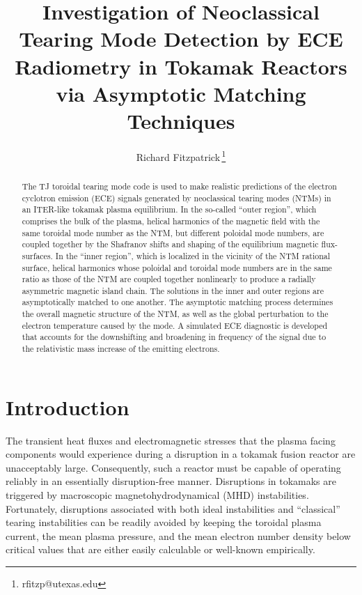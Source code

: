 \documentclass[12pt,prb,aps]{revtex4-1}
\begin{document}
\title{Investigation of Neoclassical Tearing Mode Detection by ECE Radiometry in  Tokamak Reactors via Asymptotic Matching Techniques}
\author{Richard Fitzpatrick\,\footnote{rfitzp@utexas.edu}}

\begin{abstract}
The TJ toroidal tearing mode code is used to make realistic predictions of  the electron cyclotron emission (ECE) signals generated by  neoclassical
tearing modes (NTMs) in an ITER-like tokamak plasma equilibrium. In the so-called ``outer region'', which comprises the bulk of the plasma, helical
harmonics of the magnetic field with the same toroidal mode number as the NTM, but different poloidal mode numbers, are coupled together by the Shafranov shifts and
shaping of the equilibrium magnetic flux-surfaces. In the ``inner region'', which is localized in the vicinity of the NTM rational surface, helical harmonics whose
poloidal and toroidal mode numbers are in the same ratio as those of the NTM are coupled together nonlinearly to produce a radially asymmetric magnetic
island chain. The solutions in the inner and outer regions are asymptotically matched to one another. The asymptotic matching process determines the
overall magnetic structure of the NTM, as well as the global  perturbation to the electron temperature caused by the mode. A simulated ECE diagnostic is developed that accounts for the
 downshifting and broadening in frequency of the signal due to the relativistic mass increase of the emitting electrons. 

\end{abstract}
\maketitle

\section{Introduction}
The transient heat fluxes and electromagnetic stresses that the plasma facing components would experience during a disruption in
a tokamak fusion reactor are unacceptably large.\cite{iter,wesson}  Consequently, such a reactor must be capable of  operating reliably in an essentially disruption-free manner. 
Disruptions in tokamaks are triggered by macroscopic magnetohydrodynamical (MHD) instabilities.\cite{jet} Fortunately, disruptions associated with both ideal instabilities   and
``classical'' tearing instabilities can   be readily avoided  by keeping the toroidal plasma current, the  mean plasma pressure, and
the mean electron number density below  critical values that are either easily calculable or well-known empirically.\cite{iter}  
\end{document}

